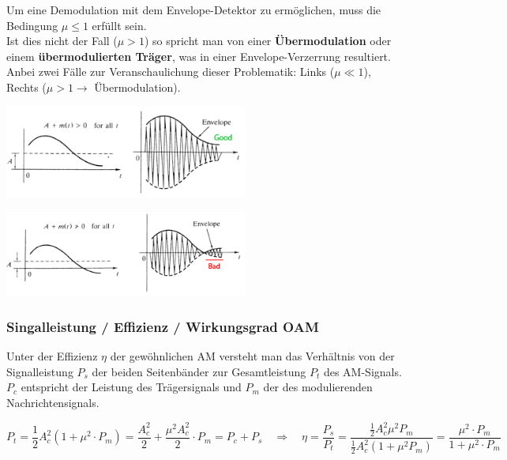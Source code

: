 Um eine Demodulation mit dem Envelope-Detektor zu ermöglichen, muss die Bedingung 
\textbf{$\mu \leq 1$} erfüllt sein. \\
Ist dies nicht der Fall (\textbf{$\mu > 1$}) so spricht man von einer \textbf{Übermodulation} oder
einem  \textbf{übermodulierten Träger}, was in einer Envelope-Verzerrung resultiert. \\
Anbei zwei Fälle zur Veranschaulichung dieser Problematik: Links ($\mu \ll 1$), Rechts ($\mu > 1
\rightarrow $ Übermodulation).

\begin{minipage}[t][2.3cm][c]{9.5cm}
	\begin{center}
      \includegraphics[width=8cm]{bilder/am_oam_enveloppeGood.png}
	\end{center}
\end{minipage}
\begin{minipage}[t][2.3cm][c]{9.5cm}
    \begin{center}
    	\includegraphics[width=8cm]{bilder/am_oam_enveloppeBad.png}
	\end{center}
\end{minipage}

\subsubsection{Singalleistung / Effizienz / Wirkungsgrad OAM }
Unter der Effizienz $ \eta $ der gewöhnlichen AM versteht man das Verhältnis von der Signalleistung
$P_s$ der beiden Seitenbänder zur Gesamtleistung $P_t$ des AM-Signals. $P_c$ entspricht der Leistung des Trägersignals und $P_m$ der des modulierenden Nachrichtensignals.

\[ P_t = \frac{1}{2}A_c^2(1 + \mu^2 \cdot P_m) =  \frac{A_c^2}{2} + \frac{\mu^2 A_c^2}{2}\cdot P_m = P_c + P_s  \quad 
\Longrightarrow 
\quad \eta = \frac{P_s}{P_t} = \frac{\frac{1}{2}A_c^2 \mu^2 P_m}{\frac{1}{2}A_c^2(1 + \mu^2 P_m)} = \frac{\mu^2 \cdot P_m}{1 + \mu^2 \cdot P_m}\]

